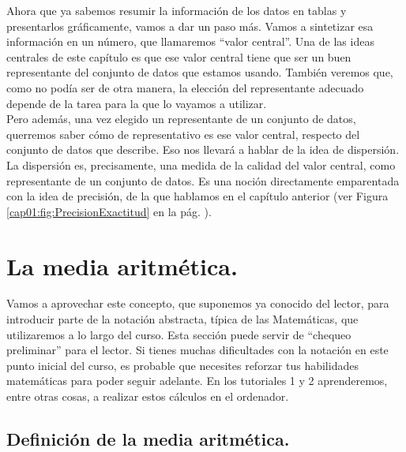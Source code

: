 

Ahora que ya sabemos resumir la información de los datos en tablas y
presentarlos gráficamente, vamos a dar un paso más. Vamos a sintetizar esa
información en un número, que llamaremos ``valor central''. Una de las ideas centrales de este capítulo es que ese valor central tiene que ser un buen representante del conjunto de datos que estamos usando. También veremos que, como no podía ser de otra manera, la elección del representante adecuado depende de la tarea para la que lo vayamos a utilizar. \\
Pero además, una vez elegido un representante de un conjunto de datos,
querremos saber cómo de representativo es ese valor central, respecto del
conjunto de datos que describe. Eso nos llevará a hablar de la idea de
dispersión. La dispersión es, precisamente, una medida de la calidad del valor
central, como representante de un conjunto de datos. Es una noción directamente
emparentada con la idea de precisión, de la que hablamos en el capítulo
anterior (ver Figura \ref{cap01:fig:PrecisionExactitud} en la pág.
\pageref{cap01:fig:PrecisionExactitud}).

\section{La media aritmética.}
\label{cap02:sec:MediaAritmetica}

Vamos a aprovechar este concepto, que suponemos ya conocido del lector, para
introducir parte de la notación abstracta, típica de las Matemáticas, que
utilizaremos a lo largo del curso. Esta sección puede servir de ``chequeo
preliminar'' para el lector. Si tienes muchas dificultades con la notación en
este punto inicial del curso, es probable que necesites reforzar tus
habilidades matemáticas para poder seguir adelante. En los tutoriales 1 y 2 aprenderemos, entre otras cosas, a realizar estos cálculos en el ordenador.

\subsection{Definición de la media aritmética.}
\label{cap02:subsec:DefincionMediaAritmetica}

